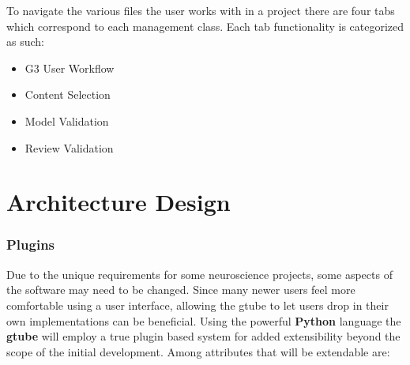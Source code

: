 \documentclass[12pt]{article}
\begin{document}
	To navigate the various files the user works with in a project there are four tabs which correspond to each management class. Each tab functionality is categorized as such:
	
\begin{itemize}
\item[] G3 User Workflow
\item[] Content Selection
\item[] Model Validation
\item[] Review Validation
\end{itemize}


\section*{Architecture Design}

\subsubsection*{Plugins}

Due to the unique requirements for some neuroscience projects, some aspects of the software may need to be changed. Since many newer users feel more comfortable using a user interface, allowing the gtube to let users drop in their own implementations can be beneficial. Using the powerful {\bf Python} language the {\bf gtube} will employ a true plugin based system for added extensibility beyond the scope of the initial development. Among attributes that will be extendable are:
\end{document}
